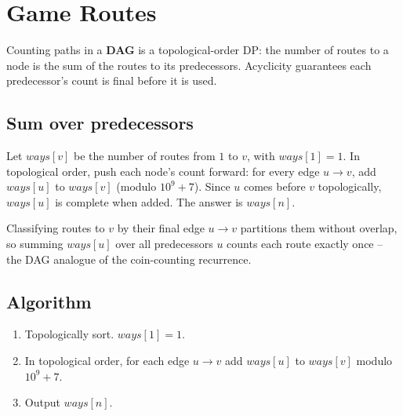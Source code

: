 \section{Game Routes}
\label{sec:cses-game-routes}


\begin{patternbox}
Counting paths in a \textbf{DAG} is a topological-order DP: the number of
routes to a node is the sum of the routes to its predecessors. Acyclicity
guarantees each predecessor's count is final before it is used.
\end{patternbox}

\subsection*{Sum over predecessors}

Let $\textit{ways}[v]$ be the number of routes from $1$ to $v$, with
$\textit{ways}[1]=1$. In topological order, push each node's count forward:
for every edge $u\to v$, add $\textit{ways}[u]$ to $\textit{ways}[v]$
(modulo $10^9+7$). Since $u$ comes before $v$ topologically,
$\textit{ways}[u]$ is complete when added. The answer is $\textit{ways}[n]$.

\begin{ideabox}
Classifying routes to $v$ by their final edge $u\to v$ partitions them
without overlap, so summing $\textit{ways}[u]$ over all predecessors $u$
counts each route exactly once -- the DAG analogue of the coin-counting
recurrence.
\end{ideabox}

\subsection*{Algorithm}

\begin{enumerate}
  \item Topologically sort. $\textit{ways}[1]=1$.
  \item In topological order, for each edge $u\to v$ add $\textit{ways}[u]$
        to $\textit{ways}[v]$ modulo $10^9+7$.
  \item Output $\textit{ways}[n]$.
\end{enumerate}

